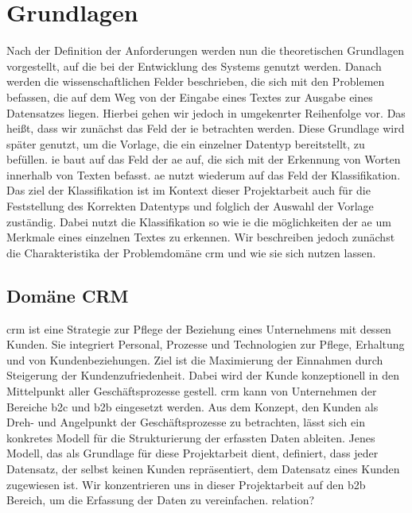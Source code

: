 \chapter{Grundlagen}
Nach der Definition der Anforderungen werden nun die theoretischen Grundlagen vorgestellt, auf die bei der Entwicklung des Systems genutzt werden. Danach werden die wissenschaftlichen Felder beschrieben, die sich mit den Problemen befassen, die auf dem Weg von der Eingabe eines Textes zur Ausgabe eines Datensatzes liegen. Hierbei gehen wir jedoch in umgekenrter Reihenfolge vor. Das heißt, dass wir zunächst das Feld der \gls{ie} betrachten werden. Diese Grundlage wird später genutzt, um die Vorlage, die ein einzelner Datentyp bereitstellt, zu befüllen. \gls{ie} baut auf das Feld der \gls{ae} auf, die sich mit der Erkennung von Worten innerhalb von Texten befasst. \gls{ae} nutzt wiederum auf das Feld der Klassifikation. Das ziel der Klassifikation ist im Kontext dieser Projektarbeit auch für die Feststellung des Korrekten Datentyps und folglich der Auswahl der Vorlage zuständig. Dabei nutzt die Klassifikation so wie \gls{ie} die möglichkeiten der \gls{ae} um Merkmale eines einzelnen Textes zu erkennen. Wir beschreiben jedoch zunächst die Charakteristika der Problemdomäne \gls{crm} und wie sie sich nutzen lassen.


\section{Domäne CRM}
\gls{crm} ist eine Strategie zur Pflege der Beziehung eines Unternehmens mit dessen Kunden. Sie integriert Personal, Prozesse und Technologien zur Pflege, Erhaltung und von Kundenbeziehungen. Ziel ist die Maximierung der Einnahmen durch Steigerung der Kundenzufriedenheit. Dabei wird der Kunde konzeptionell in den Mittelpunkt aller Geschäftsprozesse gestell. \gls{crm} kann von Unternehmen der Bereiche \gls{b2c} und \gls{b2b} eingesetzt werden.\cite{chen2003understanding} Aus dem Konzept, den Kunden als Dreh- und Angelpunkt der Geschäftsprozesse zu betrachten, lässt sich ein konkretes Modell für die Strukturierung der erfassten Daten ableiten. Jenes Modell, das als Grundlage für diese Projektarbeit dient, definiert, dass jeder Datensatz, der selbst keinen Kunden repräsentiert, dem Datensatz eines Kunden zugewiesen ist. \cite{puckey2001modeling} Wir konzentrieren uns in dieser Projektarbeit auf den \gls{b2b} Bereich, um die Erfassung der Daten zu vereinfachen.
relation?

